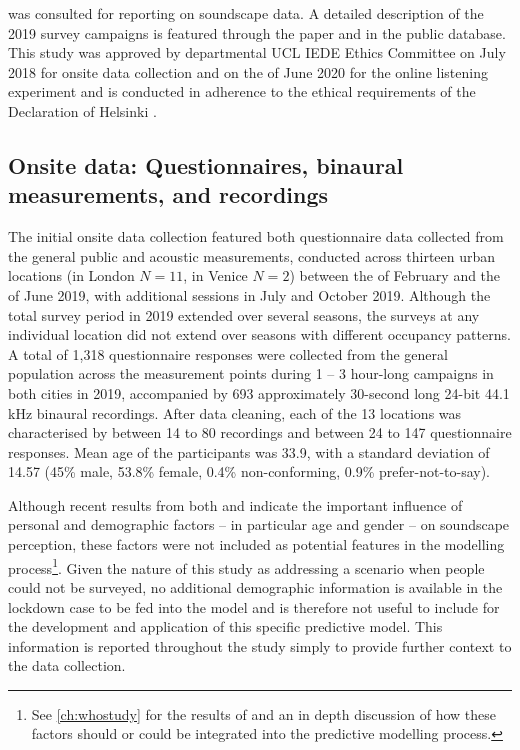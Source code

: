 \citet{ISO12913Part2} was consulted for reporting on soundscape data. A detailed description of the 2019 survey campaigns is featured through the paper and in the public database. This study was approved by departmental UCL IEDE Ethics Committee on  July 2018 for onsite data collection and on the  of June 2020 for the online listening experiment and is conducted in adherence to the ethical requirements of the Declaration of Helsinki \citep{WMA2013World}.

 \subsection{Onsite data: Questionnaires, binaural measurements, and recordings}
 
   The initial onsite data collection featured both questionnaire data collected from the general public and acoustic measurements, conducted across thirteen urban locations (in London $N=11$, in Venice $N=2$) between the  of February and the  of June 2019, with additional sessions in July and October 2019. Although the total survey period in 2019 extended over several seasons, the surveys at any individual location did not extend over seasons with different occupancy patterns. A total of 1,318 questionnaire responses were collected from the general population across the measurement points during 1 -- 3 hour-long campaigns in both cities in 2019, accompanied by 693 approximately 30-second long 24-bit 44.1 kHz binaural recordings. After data cleaning, each of the 13 locations was characterised by between 14 to 80 recordings and between 24 to 147 questionnaire responses. Mean age of the participants was 33.9, with a standard deviation of 14.57 (45\% male, 53.8\% female, 0.4\% non-conforming, 0.9\% prefer-not-to-say).

   Although recent results from both \citet{Tarlao2020Investigating} and \citet{Erfanian2021Psychological} indicate the important influence of personal and demographic factors -- in particular age and gender -- on soundscape perception, these factors were not included as potential features in the modelling process\footnote{See \cref{ch:whostudy} for the results of \citep{Erfanian2021Psychological} and an in depth discussion of how these factors should or could be integrated into the predictive modelling process.}. Given the nature of this study as addressing a scenario when people could not be surveyed, no additional demographic information is available in the lockdown case to be fed into the model and is therefore not useful to include for the development and application of this specific predictive model. This information is reported throughout the study simply to provide further context to the data collection.

